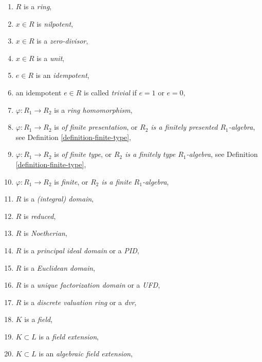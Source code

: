 \begin{enumerate}
\item $R$ is a {\it ring},
\label{item-ring}
\item $x\in R$ is {\it nilpotent},
\label{item-ring-element-nilpotent}
\item $x\in R$ is a {\it zero-divisor},
\label{item-ring-element-zerodivisor}
\item $x\in R$ is a {\it unit},
\label{item-ring-element-unit}
\item $e \in R$ is an {\it idempotent},
\label{item-ring-element-idempotent}
\item an idempotent $e \in R$ is called {\it trivial}
if $e = 1$ or $e = 0$,
\label{item-idempotent-trivial}
\item $\varphi : R_1 \to R_2$ is a {\it ring homomorphism},
\label{item-ring-homomorphism}
\item $\varphi : R_1 \to R_2$ is {\it of finite presentation}, or
{\it $R_2$ is a finitely presented $R_1$-algebra},
see Definition \ref{definition-finite-type},
\label{item-ring-homomorphism-finite-presentation}
\item $\varphi : R_1 \to R_2$ is {\it of finite type}, or
{\it $R_2$ is a finitely type $R_1$-algebra},
see Definition \ref{definition-finite-type},
\label{item-ring-homomorphism-finite-type}
\item $\varphi : R_1 \to R_2$ is {\it finite}, or
{\it $R_2$ is a finite $R_1$-algebra},
\label{item-ring-homomorphism-finite}
\item $R$ is a {\it (integral) domain},
\label{item-ring-domain}
\item $R$ is {\it reduced},
\label{item-ring-reduced}
\item $R$ is {\it Noetherian},
\label{item-ring-Noetherian}
\item $R$ is a {\it principal ideal domain} or a {\it PID},
\label{item-ring-PID}
\item $R$ is a {\it Euclidean domain},
\label{item-ring-Euclidean}
\item $R$ is a {\it unique factorization domain} or a {\it UFD},
\label{item-ring-UFD}
\item $R$ is a {\it discrete valuation ring} or a {\it dvr},
\label{item-ring-dvr}
\item $K$ is a {\it field},
\label{item-field}
\item $K \subset L$ is a {\it field extension},
\label{item-field-extension}
\item $K \subset L$ is an {\it algebraic field extension},

\end{enumerate}
